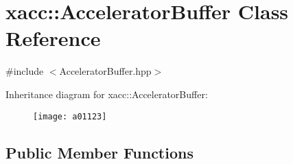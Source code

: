 \hypertarget{a01123}{}\section{xacc\+:\+:Accelerator\+Buffer Class Reference}
\label{a01123}


{\ttfamily \#include $<$Accelerator\+Buffer.\+hpp$>$}

Inheritance diagram for xacc\+:\+:Accelerator\+Buffer\+:\begin{figure}[H]
\begin{center}
\leavevmode
\texttt{[image: a01123]}
\end{center}
\end{figure}
\subsection*{Public Member Functions}
